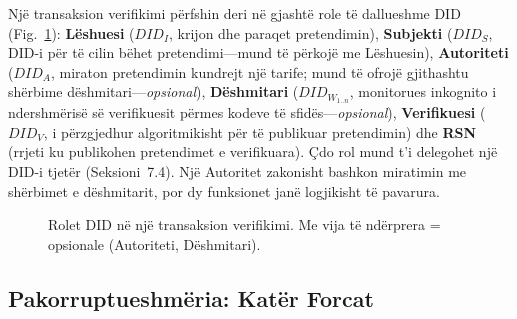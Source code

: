 \documentclass[11pt,a4paper,twocolumn]{article}
\begin{document}
Një transaksion verifikimi përfshin deri në gjashtë role të dallueshme DID (Fig.~\ref{fig:roles}): \textbf{Lëshuesi} ($DID_I$, krijon dhe paraqet pretendimin), \textbf{Subjekti} ($DID_S$, DID-i për të cilin bëhet pretendimi---mund të përkojë me Lëshuesin), \textbf{Autoriteti} ($DID_A$, miraton pretendimin kundrejt një tarife; mund të ofrojë gjithashtu shërbime dëshmitari---\emph{opsional}), \textbf{Dëshmitari} ($DID_{W_{1..n}}$, monitorues inkognito i ndershmërisë së verifikuesit përmes kodeve të sfidës---\emph{opsional}), \textbf{Verifikuesi} ($DID_V$, i përzgjedhur algoritmikisht për të publikuar pretendimin) dhe \textbf{RSN} (rrjeti ku publikohen pretendimet e verifikuara). Çdo rol mund t'i delegohet një DID-i tjetër (Seksioni~7.4). Një Autoritet zakonisht bashkon miratimin me shërbimet e dëshmitarit, por dy funksionet janë logjikisht të pavarura.

\begin{figure}[ht]
\centering
{}
\caption{Rolet DID në një transaksion verifikimi. Me vija të ndërprera = opsionale (Autoriteti, Dëshmitari).}
\label{fig:roles}
\end{figure}

\subsection{Pakorruptueshmëria: Katër Forcat}
\end{document}
